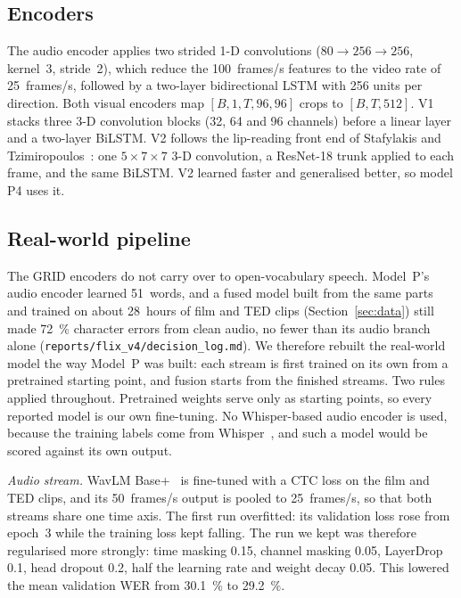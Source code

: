 \subsection{Encoders}
The audio encoder applies two strided 1-D convolutions ($80 \rightarrow 256 \rightarrow 256$,
kernel~3, stride~2), which reduce the 100~frames/s features to the video rate of 25~frames/s,
followed by a two-layer bidirectional LSTM with 256 units per direction. Both visual encoders
map $[B, 1, T, 96, 96]$ crops to $[B, T, 512]$. V1 stacks three 3-D convolution blocks (32, 64
and 96 channels) before a linear layer and a two-layer BiLSTM. V2 follows the lip-reading
front end of Stafylakis and Tzimiropoulos~\cite{stafylakis2017}: one $5 \times 7 \times 7$ 3-D
convolution, a ResNet-18 trunk applied to each frame, and the same BiLSTM. V2 learned faster
and generalised better, so model P4 uses it.

\subsection{Real-world pipeline}
\label{sec:pipelines-real}
The GRID encoders do not carry over to open-vocabulary speech. Model~P's audio encoder learned
51~words, and a fused model built from the same parts and trained on about 28~hours of film and
TED clips (Section~\ref{sec:data}) still made 72~\% character errors from clean audio, no fewer
than its audio branch alone (\texttt{reports/\allowbreak{}flix\_\allowbreak{}v4/\allowbreak{}decision\_\allowbreak{}log.md}). We therefore rebuilt the
real-world model the way Model~P was built: each stream is first trained on its own from a
pretrained starting point, and fusion starts from the finished streams. Two rules applied
throughout. Pretrained weights serve only as starting points, so every reported model is our own
fine-tuning. No Whisper-based audio encoder is used, because the training labels come from
Whisper~\cite{radford2023whisper}, and such a model would be scored against its own output.

\textit{Audio stream.} WavLM Base+~\cite{chen2022wavlm} is fine-tuned with a CTC loss on the film
and TED clips, and its 50~frames/s output is pooled to 25~frames/s, so that both streams share
one time axis. The first run overfitted: its validation loss rose from epoch~3 while the training
loss kept falling. The run we kept was therefore regularised more strongly: time masking 0.15,
channel masking 0.05, LayerDrop 0.1, head dropout 0.2, half the learning rate and weight decay
0.05. This lowered the mean validation WER from 30.1~\% to 29.2~\%.

